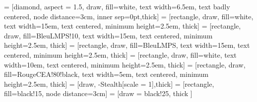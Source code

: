  = [diamond, aspect = 1.5, draw, fill=white, text width=6.5em, text badly centered, node distance=3cm, inner sep=0pt,thick]
 = [rectangle, draw, fill=white, text width=15em, text centered, minimum height=2.5em, thick]
 = [rectangle, draw, fill=BleuLMPS!10, text width=15em, text centered, minimum height=2.5em, thick]
 = [rectangle, draw, fill=BleuLMPS, text width=15em, text centered, minimum height=2.5em, thick]
 = [rectangle, draw, fill=white, text width=10em, text centered, minimum height=2.5em, thick]
 = [rectangle, draw, fill=RougeCEA!80!black, text width=5em, text centered, minimum height=2.5em, thick]
 = [draw, -{Stealth[scale = 1]},thick]
 = [rectangle, fill=black!15, node distance=3cm]
 = [draw = black!25, thick ]


